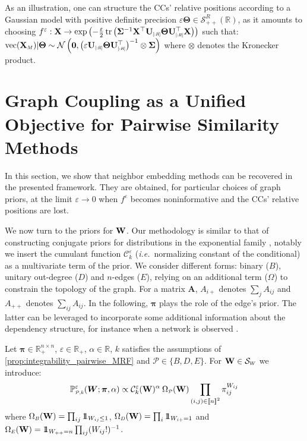 As an illustration, one can structure the CCs' relative positions according to a Gaussian model with positive definite precision $\varepsilon \bm{\Theta} \in \mathcal{S}_{++}^R(\mathbb{R})$, as it amounts to choosing $f^{\varepsilon} : \Xb \to \exp \left(-\frac{\varepsilon}{2} \operatorname{tr}\left(\bm{\Sigma}^{-1}\Xb^\top\Ub_{\scaleto{[:R]}{5pt}}  \bm{\Theta}\Ub^\top_{\scaleto{[:R]}{5pt}} \Xb\right)\right)$ such that: $\mathrm{vec}(\Xb_{\scaleto{M}{4pt}}) | \bm{\Theta} \sim \mathcal{N}\left(\bm{0}, \left(\varepsilon \Ub_{\scaleto{[:R]}{5pt}}  \bm{\Theta}\Ub^\top_{\scaleto{[:R]}{5pt}}\right)^{-1} \otimes \bm{\Sigma}\right)$ where $\otimes$ denotes the Kronecker product.

\section{Graph Coupling as a Unified Objective for Pairwise Similarity Methods}\label{sec:GC_unified}

In this section, we show that neighbor embedding methods can be recovered in the presented framework. They are obtained, for particular choices of graph priors, at the limit $\varepsilon \to 0$ when $f^{\varepsilon}$ becomes noninformative and the CCs' relative positions are lost. 

We now turn to the priors for $\mathbf{W}$. Our methodology is similar to that of constructing conjugate priors for distributions in the exponential family \cite{wainwright2008graphical}, notably we insert the cumulant function $\mathcal{C}_k^{\varepsilon}$ (\textit{i.e.}\ normalizing constant of the conditional) as a multivariate term of the prior. 
We consider different forms: binary ($B$), unitary out-degree ($D$) and $n$-edges ($E$), relying on an additional term ($\Omega$) to constrain the topology of the graph. For a matrix $\bm{A}$, $A_{i+}$ denotes $\sum_j A_{ij}$ and $A_{++}$ denotes $\sum_{ij} A_{ij}$. In the following, $\bm{\pi}$ plays the role of the edge's prior. The latter can be leveraged to incorporate some additional information about the dependency structure, for instance when a network is observed \cite{li2020high}. 

\begin{definition}\label{def:prior_W}
Let $\bm{\pi} \in \mathbb{R}_+^{n \times n}$, $\varepsilon \in \mathbb{R}_+$, $\alpha \in \mathbb{R}$, $k$ satisfies the assumptions of \cref{prop:integrability_pairwise_MRF} and $\mathcal{P} \in \{B,D,E\}$. For $\Wb \in \mathcal{S}_{\scaleto{W}{4pt}}$ we introduce:
$$\mathbb{P}_{\scaleto{\mathcal{P},k}{5pt}}^{\varepsilon}(\bm{W}; \bm{\pi}, \alpha) \propto \mathcal{C}^{\varepsilon}_k(\Wb)^{\alpha} \: \Omega_{\scaleto{\mathcal{P}}{4pt}}(\Wb) \prod_{(i,j) \in \integ{n}^2} \pi_{ij}^{W_{ij}}$$
where $\Omega_{\scaleto{B}{4pt}}(\Wb) = \prod_{ij} \ind_{W_{ij} \leq 1}$, $\Omega_{\scaleto{D}{4pt}}(\Wb) = \prod_{i} \ind_{W_{i+} = 1}$ and $\Omega_{\scaleto{E}{4pt}}(\Wb) = \ind_{W_{++} = n}\prod_{ij}(W_{ij}!)^{-1}$.
\end{definition}

